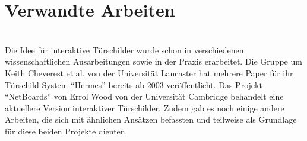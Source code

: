 \chapter{Verwandte Arbeiten}
\\
Die Idee für interaktive Türschilder wurde schon in verschiedenen wissenschaftlichen Ausarbeitungen sowie in der Praxis erarbeitet.
Die Gruppe um Keith Cheverest et al. von der Universität Lancaster hat mehrere Paper für ihr Türschild-System ``Hermes''\cite{cheverest:2003:paper} bereits ab 2003 veröffentlicht.
Das Projekt ``NetBoards'' von Errol Wood\cite{wood:2014} von der Universität Cambridge behandelt eine aktuellere Version interaktiver Türschilder.
Zudem gab es noch einige andere Arbeiten, die sich mit ähnlichen Ansätzen befassten und teilweise als Grundlage für diese beiden Projekte dienten.

